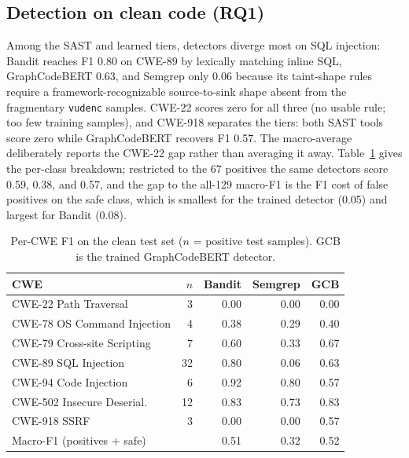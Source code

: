 \documentclass[conference]{IEEEtran}
\begin{document}
\subsection{Detection on clean code (RQ1)}
Among the SAST and learned tiers, detectors diverge most on SQL
injection: Bandit reaches F1 0.80 on CWE-89 by lexically matching inline
SQL, GraphCodeBERT 0.63, and Semgrep only 0.06 because its taint-shape
rules require a framework-recognizable source-to-sink shape absent from
the fragmentary \texttt{vudenc} samples. CWE-22 scores zero for all three
(no usable rule; too few training samples), and CWE-918 separates the
tiers: both SAST tools score zero while GraphCodeBERT recovers F1 0.57.
The macro-average deliberately reports the CWE-22 gap rather than
averaging it away. Table~\ref{tab:clean-percwe} gives the per-class
breakdown; restricted to the 67 positives the same detectors score
0.59, 0.38, and 0.57, and the gap to the all-129 macro-F1 is the F1 cost
of false positives on the safe class, which is smallest for the trained
detector (0.05) and largest for Bandit (0.08).

\begin{table}[t]
\caption{Per-CWE F1 on the clean test set ($n$ = positive test samples).
GCB is the trained GraphCodeBERT detector.}
\label{tab:clean-percwe}
\centering
\begin{tabular}{lrrrr}
\toprule
\textbf{CWE} & $n$ & \textbf{Bandit} & \textbf{Semgrep} & \textbf{GCB} \\
\midrule
CWE-22  Path Traversal       &  3 & 0.00 & 0.00 & 0.00 \\
CWE-78  OS Command Injection &  4 & 0.38 & 0.29 & 0.40 \\
CWE-79  Cross-site Scripting &  7 & 0.60 & 0.33 & 0.67 \\
CWE-89  SQL Injection        & 32 & 0.80 & 0.06 & 0.63 \\
CWE-94  Code Injection       &  6 & 0.92 & 0.80 & 0.57 \\
CWE-502 Insecure Deserial.   & 12 & 0.83 & 0.73 & 0.83 \\
CWE-918 SSRF                 &  3 & 0.00 & 0.00 & 0.57 \\
\midrule
Macro-F1 (positives $+$ safe) &   & 0.51 & 0.32 & 0.52 \\
\bottomrule
\end{tabular}
\end{table}
\end{document}
